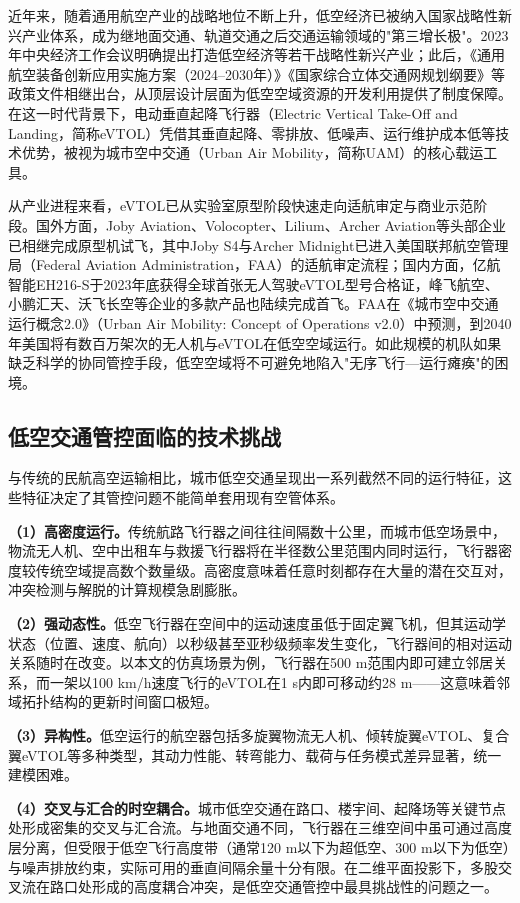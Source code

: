 \documentclass[12pt,a4paper,UTF8]{ctexbook}
\begin{document}
近年来，随着通用航空产业的战略地位不断上升，低空经济已被纳入国家战略性新兴产业体系，成为继地面交通、轨道交通之后交通运输领域的"第三增长极"。2023年中央经济工作会议明确提出打造低空经济等若干战略性新兴产业；此后，《通用航空装备创新应用实施方案（2024--2030年）》《国家综合立体交通网规划纲要》等政策文件相继出台，从顶层设计层面为低空空域资源的开发利用提供了制度保障。在这一时代背景下，电动垂直起降飞行器（Electric Vertical Take-Off and Landing，简称eVTOL）凭借其垂直起降、零排放、低噪声、运行维护成本低等技术优势，被视为城市空中交通（Urban Air Mobility，简称UAM）的核心载运工具。

从产业进程来看，eVTOL已从实验室原型阶段快速走向适航审定与商业示范阶段。国外方面，Joby Aviation、Volocopter、Lilium、Archer Aviation等头部企业已相继完成原型机试飞，其中Joby S4与Archer Midnight已进入美国联邦航空管理局（Federal Aviation Administration，FAA）的适航审定流程；国内方面，亿航智能EH216-S于2023年底获得全球首张无人驾驶eVTOL型号合格证，峰飞航空、小鹏汇天、沃飞长空等企业的多款产品也陆续完成首飞。FAA在《城市空中交通运行概念2.0》（Urban Air Mobility: Concept of Operations v2.0）中预测，到2040年美国将有数百万架次的无人机与eVTOL在低空空域运行\cite{ref1}。如此规模的机队如果缺乏科学的协同管控手段，低空空域将不可避免地陷入"无序飞行—运行瘫痪"的困境。

\subsection{低空交通管控面临的技术挑战}

与传统的民航高空运输相比，城市低空交通呈现出一系列截然不同的运行特征，这些特征决定了其管控问题不能简单套用现有空管体系。

\textbf{（1）高密度运行。}传统航路飞行器之间往往间隔数十公里，而城市低空场景中，物流无人机、空中出租车与救援飞行器将在半径数公里范围内同时运行，飞行器密度较传统空域提高数个数量级。高密度意味着任意时刻都存在大量的潜在交互对，冲突检测与解脱的计算规模急剧膨胀。

\textbf{（2）强动态性。}低空飞行器在空间中的运动速度虽低于固定翼飞机，但其运动学状态（位置、速度、航向）以秒级甚至亚秒级频率发生变化，飞行器间的相对运动关系随时在改变。以本文的仿真场景为例，飞行器在500 m范围内即可建立邻居关系，而一架以100 km/h速度飞行的eVTOL在1 s内即可移动约28 m——这意味着邻域拓扑结构的更新时间窗口极短。

\textbf{（3）异构性。}低空运行的航空器包括多旋翼物流无人机、倾转旋翼eVTOL、复合翼eVTOL等多种类型，其动力性能、转弯能力、载荷与任务模式差异显著，统一建模困难。

\textbf{（4）交叉与汇合的时空耦合。}城市低空交通在路口、楼宇间、起降场等关键节点处形成密集的交叉与汇合流。与地面交通不同，飞行器在三维空间中虽可通过高度层分离，但受限于低空飞行高度带（通常120 m以下为超低空、300 m以下为低空）与噪声排放约束，实际可用的垂直间隔余量十分有限。在二维平面投影下，多股交叉流在路口处形成的高度耦合冲突，是低空交通管控中最具挑战性的问题之一。
\end{document}
